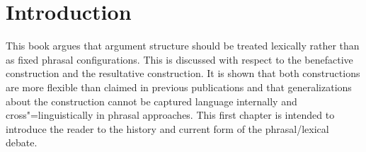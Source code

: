 

\chapter{Introduction}

This book argues that argument structure should be treated lexically rather than as fixed phrasal
configurations. This is discussed with respect to the benefactive construction and the resultative
construction. It is shown that both constructions are more flexible than claimed in previous
publications and that generalizations about the construction cannot be captured language internally
and cross"=linguistically in phrasal approaches. This first chapter is intended to introduce the
reader to the history and current form of the phrasal/lexical debate.

